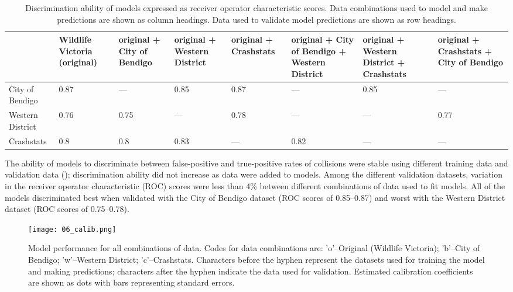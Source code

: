 \begin{table}[htp]
\caption[Discrimination ability of models using all combinations of independent data]{Discrimination ability of models expressed as receiver operator characteristic scores. Data combinations used to model and make predictions are shown as column headings. Data used to validate model predictions are shown as row headings.}
\centering
\begin{tabularx}{0.9\textwidth}{YYYYYYYY} \toprule
	& Wildlife Victoria
(original) & original + City of Bendigo & original + Western District & original + Crashstats & original + City of Bendigo + Western District & original + Western District + Crashstats & original + Crashstats + City of Bendigo \\ 
  \midrule
City of Bendigo & 0.87 & --- & 0.85 & 0.87 & --- & 0.85 & --- \\ 
Western District & 0.76 & 0.75 & --- & 0.78 & --- & --- & 0.77 \\ 
Crashstats & 0.8 & 0.8 & 0.83 & --- & 0.82 & --- & --- \\
\bottomrule
\end{tabularx}
\label{val_glm_roc}
\end{table}

The ability of models to discriminate between false-positive and true-positive rates of collisions were stable using different training data and validation data (); discrimination ability did not increase as data were added to models. Among the different validation datasets, variation in the receiver operator characteristic (ROC) scores were less than 4\% between different combinations of data used to fit models. All of the models discriminated best when validated with the City of Bendigo dataset (ROC scores of 0.85--0.87) and worst with the Western District dataset (ROC scores of 0.75--0.78). 

\begin{figure*}[htp]
  \centering
  \texttt{[image: 06\_calib.png]}
  \caption[Collision model calibration for all combinations of original and independent data]{Model performance for all combinations of data. Codes for data combinations are: 'o'--Original (Wildlife Victoria); 'b'--City of Bendigo; 'w'--Western District; 'c'--Crashstats. Characters before the hyphen represent the datasets used for training the model and making predictions; characters after the hyphen indicate the data used for validation. Estimated calibration coefficients are shown as dots with bars representing standard errors.}
  \label{val_calib}
\end{figure*}

